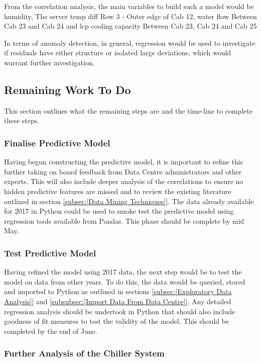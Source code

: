 \documentclass[12pt]{scrartcl}
\begin{document}
From the correlation analysis, the main variables to build such a model would be humidity, The server temp diff Row 3 - Outer edge of Cab 12, water flow Between Cab 23 and Cab 24 and lcp cooling capacity Between Cab 23, Cab 24 and Cab 25

In terms of anomaly detection, in general, regression would be used to investigate if residuals have either structure or isolated large deviations, which would warrant further investigation. 

\subsection{Remaining Work To Do}
\label{subsec:[Remaining Work To Do]}
This section outlines what the remaining steps are and the time-line to complete these steps.

\subsubsection{Finalise Predictive Model}
\label{subsubsec:[Finalise Predictive Model]}

Having begun constructing the predictive model, it is important to refine this further taking on board feedback from Data Centre administrators and other experts. This will also include deeper analysis of the correlations to ensure no hidden predictive features are missed and to review the existing literature outlined in section \ref{subsec:[Data Mining Techniques]}. The data already available for 2017 in Python could be used to smoke test the predictive model using regression tools available from Pandas. This phase should be complete by mid May. 

\subsubsection{Test Predictive Model}
\label{subsubsec:[Test Predictive Model]}

Having refined the model using 2017 data, the next step would be to test the model on data from other years. To do this, the data would be queried, stored and imported to Python as outlined in sections \ref{subsec:[Exploratory Data Analysis]} and \ref{subsubsec:[Import Data From Data Centre]}. Any detailed regression analysis should be undertook in Python that should also include goodness of fit measures to test the validity of the model. This should be completed by the end of June.  

\subsubsection{Further Analysis of the Chiller System}
\label{subsubsec:[Further Analysis of the Chiller System]}
\end{document}
